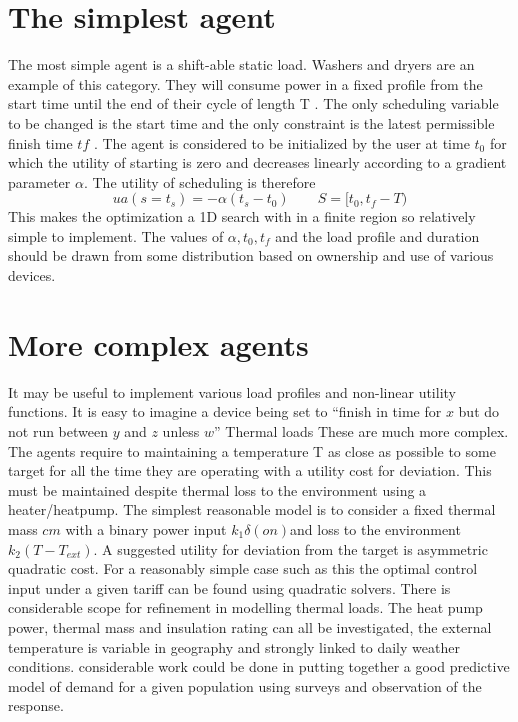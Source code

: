 \documentclass[11pt]{article}
\begin{document}

\section{The simplest agent}
The most simple agent is a shift-able static load. Washers and dryers are an
example of this category. They will consume power in a fixed profile from the
start time until the end of their cycle of length T . The only scheduling variable
to be changed is the start time and the only constraint is the latest permissible
finish time $tf$ . The agent is considered to be initialized by the user at time
$t_{0}$ for which the utility of starting is zero and decreases linearly according to a
gradient parameter $\alpha$. The utility of scheduling is therefore
\begin{equation}
u{a} (s = t_{s} ) = −\alpha (t_{s} − t_{0} )\qquad S = [t_{0} , t_{f} − T )
\end{equation}
This makes the optimization a 1D search with in a finite region so relatively
simple to implement. The values of $\alpha, t_{0} , t_{f}$ and the load profile and duration
should be drawn from some distribution based on ownership and use of various
devices.

 
\section{More complex agents}
It may be useful to implement various load profiles and non-linear utility functions. It is easy to imagine a device being set to “finish in time for $x$ but do not
run between $y$ and $z$ unless $w$”
Thermal loads
These are much more complex. The agents require to maintaining a temperature T as close as possible to some target for all the time they are operating
with a utility cost for deviation. This must be maintained despite thermal loss
to the environment using a heater/heatpump. The simplest reasonable model
is to consider a fixed thermal mass $cm$ with a binary power input $k_{1} \delta (on)$and
loss to the environment $k_{2} (T - T_{ext} )$. A suggested utility for deviation from
the target is asymmetric quadratic cost. For a reasonably simple case such as
this the optimal control input under a given tariff can be found using quadratic
solvers.
There is considerable scope for refinement in modelling thermal loads. The
heat pump power, thermal mass and insulation rating can all be investigated,
the external temperature is variable in geography and strongly linked to daily
weather conditions. considerable work could be done in putting together a good
predictive model of demand for a given population using surveys and observation
of the response.
\end{document}
